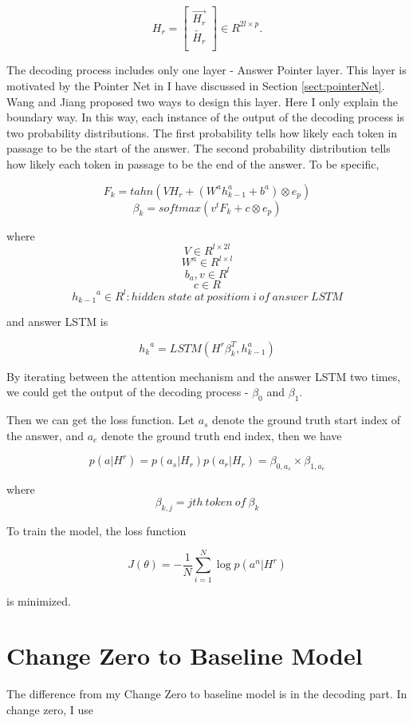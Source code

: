 \documentclass[modernstyle,12pt]{sjsuthesis}
\theoremstyle{definition}
\begin{document}
\[ H_r =
\begin{bmatrix}
\overrightarrow{H_r} \\
\overleftarrow{H_r} \\
\end{bmatrix}
\in R^{2l \times p}.
\]

The decoding process includes only one layer - Answer Pointer layer. This layer is motivated by the Pointer Net in \cite{vinyals2015pointer} I have discussed in Section \ref{sect:pointerNet}. Wang and Jiang proposed two ways to design this layer. Here I only explain the boundary way. In this way, each instance of the output of the decoding process is two probability distributions. The first probability tells how likely each token in passage to be the start of the answer. The second probability distribution tells how likely each token in passage to be the end of the answer. To be specific,

$$F_k = tahn(VH_r + (W^a{h^a_{k-1}} +  b^a) \otimes e_p)$$
$$\beta _k = softmax(v^tF_k + c \otimes e_p)$$


where
$$V \in R^{l \times 2l}$$
$$W^a\in R^{l \times l} $$
$$b_a, v\in R^{l}  $$
$$c \in R $$
$${h_{k-1}}^a\in R^{l}: hidden\ state\ at\ positiom\ i\ of\ answer\ LSTM  $$

and answer LSTM is


$${h_k}^a = LSTM(H^r\beta _k^T, h_{k-1}^a)$$

By iterating between the attention mechanism and the answer LSTM two times, we could get the output of the decoding process - $\beta _0$ and $\beta _1$.


Then we can get the loss function. Let $a_s$ denote the ground truth start index of the answer, and $a_e$ denote the ground truth end index, then we have

$$p(a|H^r) = p(a_s|H_r)p(a_r|H_r)=\beta _{0, a_s} \times \beta_{1, a_e}$$

where $$\beta_{k, j} = jth\ token\ of\ \beta _k$$

To train the model, the loss function

$$J(\theta) = -\frac{1}{N}\sum_{i=1}^{N} \log{p(a^n|H^r)} $$

is minimized.

\section{Change Zero to Baseline Model}

The difference from my Change Zero to baseline model is in the decoding part. In change zero, I use
\end{document}
